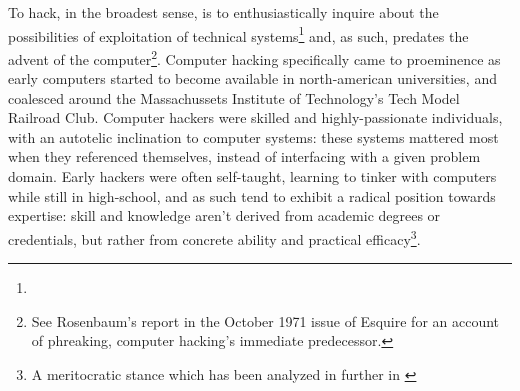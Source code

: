 To hack, in the broadest sense, is to enthusiastically inquire about the possibilities of exploitation of technical systems\footnote{} and, as such, predates the advent of the computer\footnote{See Rosenbaum's report in the October 1971 issue of Esquire for an account of phreaking, computer hacking's immediate predecessor\cite{rosenbaum_secrets_2004}.}. Computer hacking specifically came to proeminence as early computers started to become available in north-american universities, and coalesced around the Massachussets Institute of Technology's Tech Model Railroad Club\cite{levy_hackers_2010}. Computer hackers were skilled and highly-passionate individuals, with an autotelic inclination to computer systems: these systems mattered most when they referenced themselves, instead of interfacing with a given problem domain. Early hackers were often self-taught, learning to tinker with computers while still in high-school\cite{lammers_programmers_1986}, and as such tend to exhibit a radical position towards expertise: skill and knowledge aren't derived from academic degrees or credentials, but rather from concrete ability and practical efficacy\footnote{A meritocratic stance which has been analyzed in further in \cite{coleman_aesthetics_2018}}.

